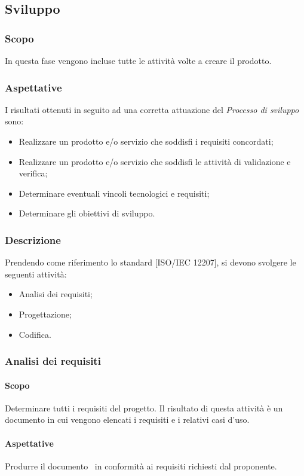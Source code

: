 \documentclass[../NormeDiProgetto.tex]{subfiles}
\begin{document}
	\subsection{Sviluppo}
		\subsubsection{Scopo}
			In questa fase vengono incluse tutte le attività volte a creare il prodotto.
		\subsubsection{Aspettative}
			I risultati ottenuti in seguito ad una corretta attuazione del
			\textit{Processo di sviluppo} sono:
			\begin{itemize}
				\item Realizzare un prodotto e/o servizio che soddisfi i requisiti concordati;
				\item Realizzare un prodotto e/o servizio che soddisfi le attività di validazione
				e verifica;
				\item Determinare eventuali vincoli tecnologici e requisiti;
				\item Determinare gli obiettivi di sviluppo.
			\end{itemize}
		\subsubsection{Descrizione}
			Prendendo come riferimento lo standard [ISO/IEC 12207], si devono svolgere le seguenti
			attività:
			\begin{itemize}
				\item Analisi dei requisiti;
				\item Progettazione;
				\item Codifica.
			\end{itemize}
		\subsubsection{Analisi dei requisiti}
			\paragraph{Scopo\\}
				Determinare tutti i requisiti del progetto. Il risultato di questa attività è un
				documento in cui vengono elencati i requisiti e i relativi casi d'uso.
			\paragraph{Aspettative\\}
				Produrre il documento \analisideirequisiti\ in conformità ai requisiti richiesti
				dal proponente.
\end{document}
